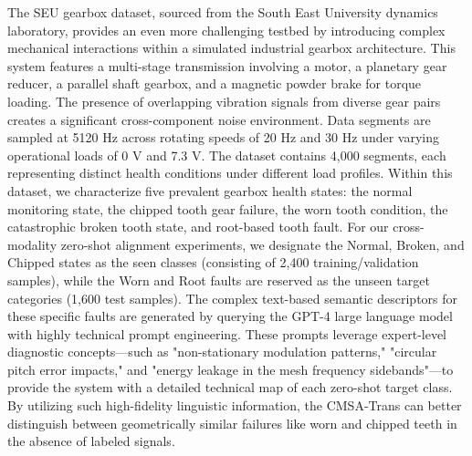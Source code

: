 \documentclass[journal]{IEEEtran}
\begin{document}
The SEU gearbox dataset, sourced from the South East University dynamics laboratory, provides an even more challenging testbed by introducing complex mechanical interactions within a simulated industrial gearbox architecture. This system features a multi-stage transmission involving a motor, a planetary gear reducer, a parallel shaft gearbox, and a magnetic powder brake for torque loading. The presence of overlapping vibration signals from diverse gear pairs creates a significant cross-component noise environment. Data segments are sampled at 5120 Hz across rotating speeds of 20 Hz and 30 Hz under varying operational loads of 0 V and 7.3 V. The dataset contains 4,000 segments, each representing distinct health conditions under different load profiles. Within this dataset, we characterize five prevalent gearbox health states: the normal monitoring state, the chipped tooth gear failure, the worn tooth condition, the catastrophic broken tooth state, and root-based tooth fault. For our cross-modality zero-shot alignment experiments, we designate the Normal, Broken, and Chipped states as the seen classes (consisting of 2,400 training/validation samples), while the Worn and Root faults are reserved as the unseen target categories (1,600 test samples). The complex text-based semantic descriptors for these specific faults are generated by querying the GPT-4 large language model with highly technical prompt engineering. These prompts leverage expert-level diagnostic concepts—such as "non-stationary modulation patterns," "circular pitch error impacts," and "energy leakage in the mesh frequency sidebands"—to provide the system with a detailed technical map of each zero-shot target class. By utilizing such high-fidelity linguistic information, the CMSA-Trans can better distinguish between geometrically similar failures like worn and chipped teeth in the absence of labeled signals.
\end{document}
